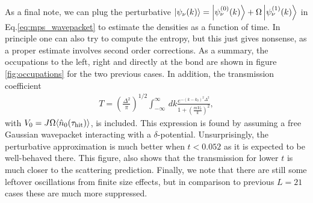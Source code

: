 \documentclass{article}
\begin{document}
As a final note, we can plug the perturbative $\ket{\psi_\nu (k)} = \ket{\psi_\nu^{(0)} (k)} + \Omega \ket{\psi_\nu^{(1)} (k)}$ in Eq.\eqref{eq:mps_wavepacket} to estimate the densities as a function of time. In principle one can also try to compute the entropy, but this just gives nonsense, as a proper estimate involves second order corrections. As a summary, the occupations to the left, right and directly at the bond are shown in figure \ref{fig:occupations} for the two previous cases. In addition, the transmission coefficient
\begin{align}\label{eq:transmission_coef}
T = \left( \frac{\Delta^2}{\pi}\right)^{1/2} \int_{-\infty}^{\infty}  \, dk \frac{e^{-(k-k_{0})^2\Delta^2}}{1+\left(\frac{m V_{0}}{k}\right)^2 },
\end{align}
with $V_0 = J \Omega \langle \hat{n}_0(\tau_{\rm{hit}}) \rangle $, is included. This expression is found by assuming a free Gaussian wavepacket interacting with a $\delta$-potential. Unsurprisingly, the perturbative approximation is much better when $t<0.052$ as it is expected to be well-behaved there. This figure, also shows that the transmission for lower $t$ is much closer to the scattering prediction. Finally, we note that
there are still some leftover oscillations from finite size effects, but in comparison to previous $L=21$ cases these are much more suppressed.
\end{document}
